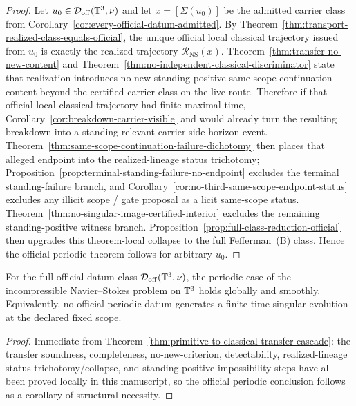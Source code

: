 \begin{proof}
Let $u_0\in\mathcal D_{\mathrm{off}}(\mathbb{T}^3,\nu)$ and let $x=[\Sigma(u_0)]$ be the admitted carrier class from Corollary~\ref{cor:every-official-datum-admitted}. By Theorem~\ref{thm:transport-realized-class-equals-official}, the unique official local classical trajectory issued from $u_0$ is exactly the realized trajectory $\mathcal R_{\mathrm{NS}}(x)$. Theorem~\ref{thm:transfer-no-new-content} and Theorem~\ref{thm:no-independent-classical-discriminator} state that realization introduces no new standing-positive same-scope continuation content beyond the certified carrier class on the live route. Therefore if that official local classical trajectory had finite maximal time, Corollary~\ref{cor:breakdown-carrier-visible} and \HorizonDetectabilityRef{} would already turn the resulting breakdown into a standing-relevant carrier-side horizon event. Theorem~\ref{thm:same-scope-continuation-failure-dichotomy} then places that alleged endpoint into the realized-lineage status trichotomy; Proposition~\ref{prop:terminal-standing-failure-no-endpoint} excludes the terminal standing-failure branch, and Corollary~\ref{cor:no-third-same-scope-endpoint-status} excludes any illicit scope / gate proposal as a licit same-scope status. Theorem~\ref{thm:no-singular-image-certified-interior} excludes the remaining standing-positive witness branch. Proposition~\ref{prop:full-class-reduction-official} then upgrades this theorem-local collapse to the full Fefferman~(B) class. Hence the official periodic theorem follows for arbitrary $u_0$.
\end{proof}

\begin{manualcorollary}
\label{cor:official-periodic-structural-corollary}
For the full official datum class $\mathcal D_{\mathrm{off}}(\mathbb{T}^3,\nu)$, the periodic case of the incompressible Navier--Stokes problem on $\mathbb{T}^3$ holds globally and smoothly. Equivalently, no official periodic datum generates a finite-time singular evolution at the declared fixed scope.
\end{manualcorollary}

\begin{proof}
Immediate from Theorem~\ref{thm:primitive-to-classical-transfer-cascade}: the transfer soundness, completeness, no-new-criterion, detectability, realized-lineage status trichotomy/collapse, and standing-positive impossibility steps have all been proved locally in this manuscript, so the official periodic conclusion follows as a corollary of structural necessity.
\end{proof}


